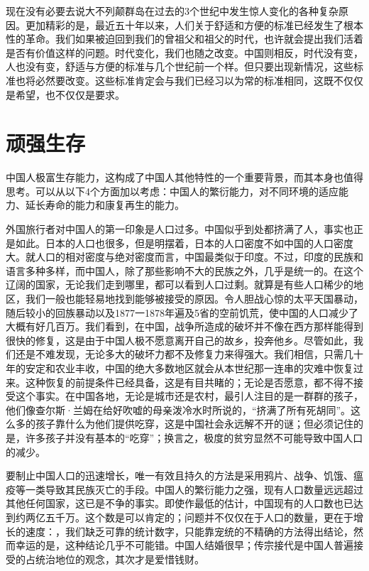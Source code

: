 \documentclass[12pt,oneside]{book}
\begin{document}
\begin{common-format}
现在没有必要去说大不列颠群岛在过去的3个世纪中发生惊人变化的各种复杂原因。更加精彩的是，最近五十年以来，人们关于舒适和方便的标准已经发生了根本性的革命。我们如果被迫回到我们的曾祖父和祖父的时代，也许就会提出我们活着是否有价值这样的问题。时代变化，我们也随之改变。中国则相反，时代没有变，人也没有变，舒适与方便的标准与几个世纪前一个样。但只要出现新情况，这些标准也将必然要改变。这些标准肯定会与我们已经习以为常的标准相同，这既不仅仅是希望，也不仅仅是要求。 

\chapter{顽强生存}
中国人极富生存能力，这构成了中国人其他特性的一个重要背景，而其本身也值得思考。可以从以下4个方面加以考虑：中国人的繁衍能力，对不同环境的适应能力、延长寿命的能力和康复再生的能力。 

外国旅行者对中国人的第一印象是人口过多。中国似乎到处都挤满了人，事实也正是如此。日本的人口也很多，但是明摆着，日本的人口密度不如中国的人口密度大。就人口的相对密度与绝对密度而言，中国最类似于印度。不过，印度的民族和语言多种多样，而中国人，除了那些影响不大的民族之外，几乎是统一的。在这个辽阔的国家，无论我们走到哪里，都可以看到人口过剩。就算是有些人口稀少的地区，我们一般也能轻易地找到能够被接受的原因。令人胆战心惊的太平天国暴动，随后较小的回族暴动以及1877一1878年遍及5省的空前饥荒，使中国的人口减少了大概有好几百万。我们看到，在中国，战争所造成的破坏并不像在西方那样能得到很快的修复，这是由于中国人极不愿意离开自己的故乡，投奔他乡。尽管如此，我们还是不难发现，无论多大的破坏力都不及修复力来得强大。我们相信，只需几十年的安定和农业丰收，中国的绝大多数地区就会从本世纪那一连串的灾难中恢复过来。这种恢复的前提条件已经具备，这是有目共睹的；无论是否愿意，都不得不接受这个事实。在中国各地，无论是城市还是农村，最引人注目的是一群群的孩子，他们像查尔斯·兰姆在给好吹嘘的母亲泼冷水时所说的，“挤满了所有死胡同”。这么多的孩子靠什么为他们提供吃穿，这是中国社会永远解不开的谜；但必须记住的是，许多孩子并没有基本的“吃穿”；换言之，极度的贫穷显然不可能导致中国人口的减少。 

要制止中国人口的迅速增长，唯一有效且持久的方法是采用鸦片、战争、饥饿、瘟疫等一类导致其民族灭亡的手段。中国人的繁衍能力之强，现有人口数量远远超过其他任何国家，这已是不争的事实。即使作最低的估计，中国现有的人口数也已达到约两亿五千万。这个数是可以肯定的；问题并不仅仅在于人口的数量，更在于增长的速度：，我们缺乏可靠的统计数字，只能靠宠统的不精确的方法得出结论，然而幸运的是，这种结论几乎不可能错。中国人结婚很早；传宗接代是中国人普遍接受的占统治地位的观念，其次才是爱惜钱财。 


\end{common-format}
\end{document}
